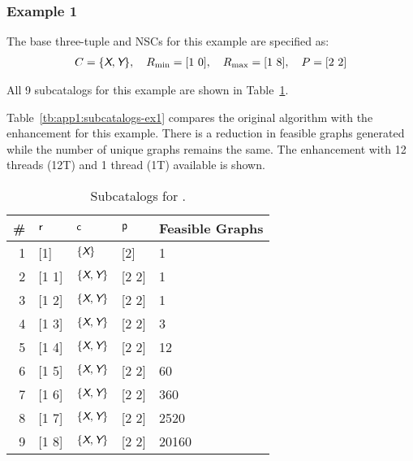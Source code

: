 \subsubsection{Example 1\label{sec:app1:subcatalogs-ex1}}

The base three-tuple and NSCs for this example are specified as:
\begin{align}
C = \{ \textsl{\textsf{X}}, \textsl{\textsf{Y}}\}, \quad R_{\min} = [1\ 0], \quad R_{\max} = [1\ 8], \quad P = [2\ 2]
\end{align}

\noindent All 9 subcatalogs for this example are shown in Table~\ref{tb:app1:subcatalogs-ex1-1}.

Table~\ref{tb:app1:subcatalogs-ex1} compares the original algorithm with the enhancement for this example. There is a reduction in feasible graphs generated while the number of unique graphs remains the same. The enhancement with 12 threads (12T) and 1 thread (1T) available is shown.

\begin{table}[!ht]
\centering
\caption{Subcatalogs for .\label{tb:app1:subcatalogs-ex1-1}}
\vspace{-1ex}
\begin{tabular}{r | l | l | l | l}
\hline \hline
\# & $\textup{\textsf{r}}$ & $\textup{\textsf{c}}$ & $\textup{\textsf{p}}$ & Feasible Graphs \\
\hline
1 & [1] & $\{ \textsl{\textsf{X}} \}$ & [2] & 1 \\
2 & [1 1] & $\{ \textsl{\textsf{X}}, \textsl{\textsf{Y}}\}$ & [2 2] & 1 \\
3 & [1 2] & $\{ \textsl{\textsf{X}}, \textsl{\textsf{Y}}\}$ & [2 2] & 1 \\
4 & [1 3] & $\{ \textsl{\textsf{X}}, \textsl{\textsf{Y}}\}$ & [2 2] & 3 \\
5 & [1 4] & $\{ \textsl{\textsf{X}}, \textsl{\textsf{Y}}\}$ & [2 2] & 12 \\
6 & [1 5] & $\{ \textsl{\textsf{X}}, \textsl{\textsf{Y}}\}$ & [2 2] & 60 \\
7 & [1 6] & $\{ \textsl{\textsf{X}}, \textsl{\textsf{Y}}\}$ & [2 2] & 360 \\
8 & [1 7] & $\{ \textsl{\textsf{X}}, \textsl{\textsf{Y}}\}$ & [2 2] & 2520 \\
9 & [1 8] & $\{ \textsl{\textsf{X}}, \textsl{\textsf{Y}}\}$ & [2 2] & 20160 \\
\hline \hline
\end{tabular}
\end{table}

